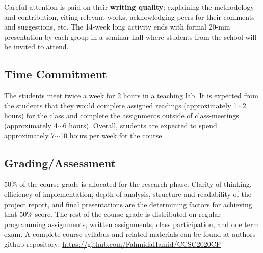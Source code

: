 \documentclass{article}
\begin{document}
\par Careful attention is paid on their {\bf writing quality}: explaining the methodology and contribution, citing relevant works, acknowledging peers for their comments and suggestions, etc. The 14-week long activity ends with formal 20-min presentation by each group in a seminar hall where students from the school will be invited to attend.

\subsection{Time Commitment}

\par The students meet twice a week for 2 hours in a teaching lab. It is expected from the students that they would complete assigned readings (approximately 1$\sim$2 hours) for the class and complete the assignments outside of class-meetings (approximately 4$\sim$6 hours). Overall, students are expected to spend approximately 7$\sim$10 hours per week for the course.

\subsection{Grading/Assessment}
50\% of the course grade is allocated for the research phase. Clarity of thinking, efficiency of implementation, depth of analysis, structure and readability
of the project report, and final presentations are the determining factors for achieving that 50\% score. The rest of the course-grade is distributed on regular programming assignments, written assignments, class participation, and one term exam. A complete course syllabus and related materials can be found at authors github repository: \url{https://github.com/FahmidaHamid/CCSC2020CP}
\end{document}
